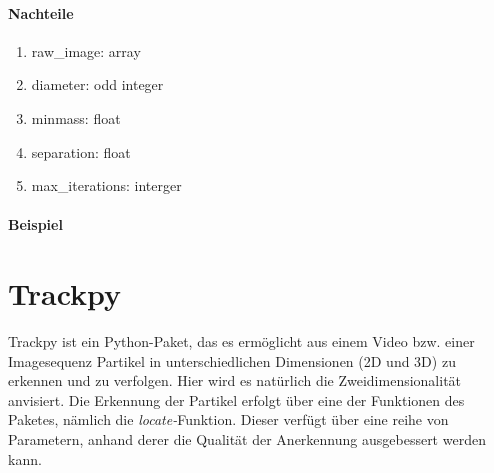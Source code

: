 	\paragraph{Nachteile}
		\begin{enumerate}
    			\item raw\_image: array \\

    			\item diameter: odd integer \\

    			\item minmass: float \\
    			
    			\item separation: float\\
 			
    			\item max\_iterations: interger\\
    			
		\end{enumerate}
		
	\paragraph{Beispiel}

\section{Trackpy}
Trackpy ist ein Python-Paket, das es ermöglicht aus einem Video bzw. einer Imagesequenz Partikel in unterschiedlichen Dimensionen (2D und 3D) zu erkennen und zu verfolgen. Hier wird es natürlich die Zweidimensionalität anvisiert. Die Erkennung der Partikel erfolgt über eine der Funktionen des Paketes, nämlich die \textit{locate-}Funktion.
Dieser verfügt über eine reihe von Parametern, anhand derer die Qualität der Anerkennung ausgebessert werden kann.

